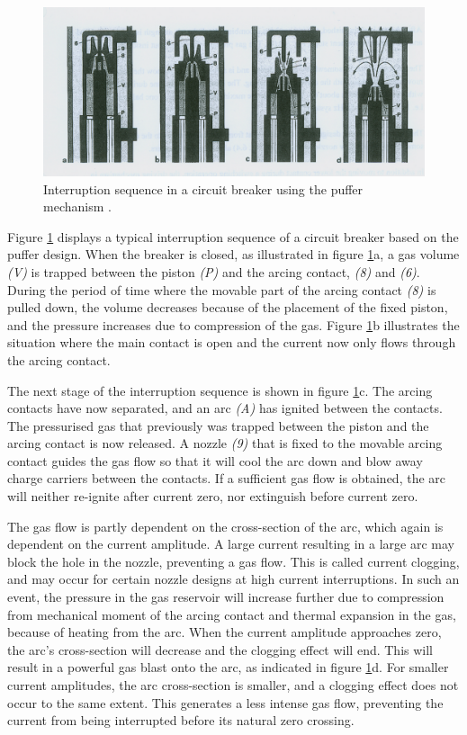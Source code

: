 \documentclass[10pt,b5paper,twoside]{article}
\begin{document}
\begin{figure} [H]
\centering
\includegraphics[scale=0.75]{Bilder/Theory/CircutBreakPuff1.png}
\caption{Interruption sequence in a circuit breaker using the puffer mechanism \cite{bib:HVEbreak}.} \label{fig:CircutBreakPuff1}
\end{figure}

Figure \ref{fig:CircutBreakPuff1} displays a typical interruption sequence of a circuit breaker based on the puffer design. When the breaker is closed, as illustrated in figure \ref{fig:CircutBreakPuff1}a, a gas volume \textit{(V)} is trapped between the piston \textit{(P)} and the arcing contact, \textit{(8)} and \textit{(6)}. During the period of time where the movable part of the arcing contact \textit{(8)} is pulled down, the volume decreases because of the placement of the fixed piston, and the pressure increases due to compression of the gas. Figure \ref{fig:CircutBreakPuff1}b illustrates the situation where the main contact is open and the current now only flows through the arcing contact.

The next stage of the interruption sequence is shown in figure \ref{fig:CircutBreakPuff1}c. The arcing contacts have now separated, and an arc \textit{(A)} has ignited between the contacts. The pressurised gas that previously was trapped between the piston and the arcing contact is now released. A nozzle \textit{(9)} that is fixed to the movable arcing contact guides the gas flow so that it will cool the arc down and blow away charge carriers between the contacts. If a sufficient gas flow is obtained, the arc will neither re-ignite after current zero, nor extinguish before current zero.

The gas flow is partly dependent on the cross-section of the arc, which again is dependent on the current amplitude. A large current resulting in a large arc may block the hole in the nozzle, preventing a gas flow. This is called current clogging, and may occur for certain nozzle designs at high current interruptions. In such an event, the pressure in the gas reservoir will increase further due to compression from mechanical moment of the arcing contact and thermal expansion in the gas, because of heating from the arc. When the current amplitude approaches zero, the arc's cross-section will decrease and the clogging effect will end. This will result in a powerful gas blast onto the arc, as indicated in figure \ref{fig:CircutBreakPuff1}d. For smaller current amplitudes, the arc cross-section is smaller, and a clogging effect does not occur to the same extent. This generates a less intense gas flow, preventing the current from being interrupted before its natural zero crossing.
\end{document}
